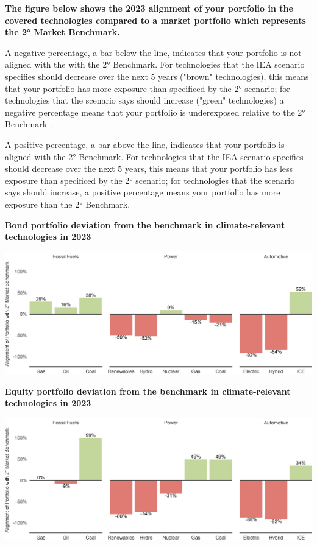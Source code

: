 \documentclass[10pt,table,a4]{article}\usepackage[]{graphicx}\usepackage[]{color}
\begin{document}
	\begin{multicols}{2}
	
		\textbf{The figure below shows the 2023 alignment of your portfolio in the covered technologies compared to a market portfolio which represents the 2° Market Benchmark.}
		
		A negative  percentage, a bar below the line, indicates that your portfolio is not aligned with the with the 2° Benchmark.  For technologies that the IEA scenario specifies should decrease over the next 5 years ("brown" technologies), this means that your portfolio has more exposure than specificed by the 2° scenario; for technologies that the scenario says should increase ("green" technologies) a negative percentage means that your portfolio is underexposed relative to the  2° Benchmark .

		A positive percentage, a bar above the line, indicates that your portfolio is aligned with the 2° Benchmark. For technologies that the IEA scenario specifies should decrease over the next 5 years, this means that your portfolio has less exposure than specificed by the 2° scenario; for technologies that the scenario says should increase, a positive  percentage means your portfolio has more exposure than the 2° Benchmark. 
		
	\end{multicols}
	
		\textbf{Bond portfolio deviation from the benchmark in climate-relevant technologies in 2023}	%
		
		\includegraphics[trim = {0 0cm 0 0cm},width=1\linewidth]{Figures/Fig07} %
	

		\textbf{Equity portfolio deviation from the benchmark in climate-relevant technologies in 2023} %
		
		\includegraphics[trim = {0 0cm 0 0cm},width=1\linewidth]{Figures/Fig06}	%
		
\end{document}
